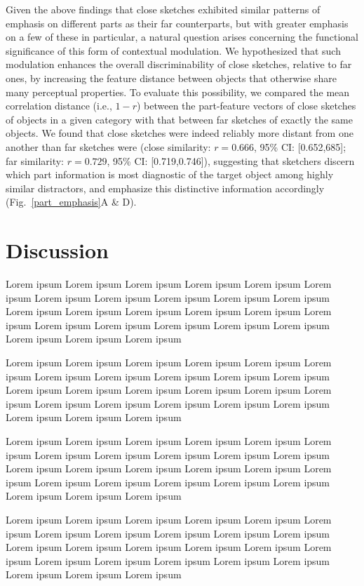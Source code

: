 \documentclass[10pt,letterpaper]{article}
\begin{document}
Given the above findings that close sketches exhibited similar patterns of emphasis on different parts as their far counterparts, but with greater emphasis on a few of these in particular, a natural question arises concerning the functional significance of this form of contextual modulation. 
We hypothesized that such modulation enhances the overall discriminability of close sketches, relative to far ones, by increasing the feature distance between objects that otherwise share many perceptual properties. 
To evaluate this possibility, we compared the mean correlation distance (i.e., $1 - r$) between the part-feature vectors of close sketches of objects in a given category with that between far sketches of exactly the same objects. 
We found that close sketches were indeed reliably more distant from one another than far sketches were (close similarity: $r = 0.666$, 95\% CI: [0.652,685]; far similarity: $r = 0.729$, 95\% CI: [0.719,0.746]), suggesting that sketchers discern which part information is most diagnostic of the target object among highly similar distractors, and emphasize this distinctive information accordingly (Fig.~\ref{part_emphasis}A \& D).

\section{Discussion}

Lorem ipsum Lorem ipsum Lorem ipsum Lorem ipsum Lorem ipsum Lorem ipsum Lorem ipsum Lorem ipsum Lorem ipsum Lorem ipsum Lorem ipsum Lorem ipsum Lorem ipsum Lorem ipsum Lorem ipsum Lorem ipsum Lorem ipsum Lorem ipsum Lorem ipsum Lorem ipsum Lorem ipsum Lorem ipsum Lorem ipsum Lorem ipsum Lorem ipsum

Lorem ipsum Lorem ipsum Lorem ipsum Lorem ipsum Lorem ipsum Lorem ipsum Lorem ipsum Lorem ipsum Lorem ipsum Lorem ipsum Lorem ipsum Lorem ipsum Lorem ipsum Lorem ipsum Lorem ipsum Lorem ipsum Lorem ipsum Lorem ipsum Lorem ipsum Lorem ipsum Lorem ipsum Lorem ipsum Lorem ipsum Lorem ipsum Lorem ipsum

Lorem ipsum Lorem ipsum Lorem ipsum Lorem ipsum Lorem ipsum Lorem ipsum Lorem ipsum Lorem ipsum Lorem ipsum Lorem ipsum Lorem ipsum Lorem ipsum Lorem ipsum Lorem ipsum Lorem ipsum Lorem ipsum Lorem ipsum Lorem ipsum Lorem ipsum Lorem ipsum Lorem ipsum Lorem ipsum Lorem ipsum Lorem ipsum Lorem ipsum

Lorem ipsum Lorem ipsum Lorem ipsum Lorem ipsum Lorem ipsum Lorem ipsum Lorem ipsum Lorem ipsum Lorem ipsum Lorem ipsum Lorem ipsum Lorem ipsum Lorem ipsum Lorem ipsum Lorem ipsum Lorem ipsum Lorem ipsum Lorem ipsum Lorem ipsum Lorem ipsum Lorem ipsum Lorem ipsum Lorem ipsum Lorem ipsum Lorem ipsum
\end{document}
